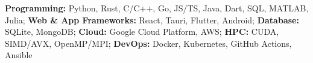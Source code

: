 \textbf{Programming:}
  Python,
  Rust,
  C/C++,
  Go,
  JS/TS,
  Java,
  Dart,
  SQL,
  MATLAB,
  Julia;
\textbf{Web \& App Frameworks:}
  React,
  Tauri,
  Flutter,
  Android;
\textbf{Database:}
  SQLite,
  MongoDB;
\textbf{Cloud:}
  Google Cloud Platform,
  AWS;
\textbf{HPC:}
  CUDA,
  SIMD/AVX,
  OpenMP/MPI;
\textbf{DevOps:}
  Docker,
  Kubernetes,
  GitHub Actions,
  Ansible
